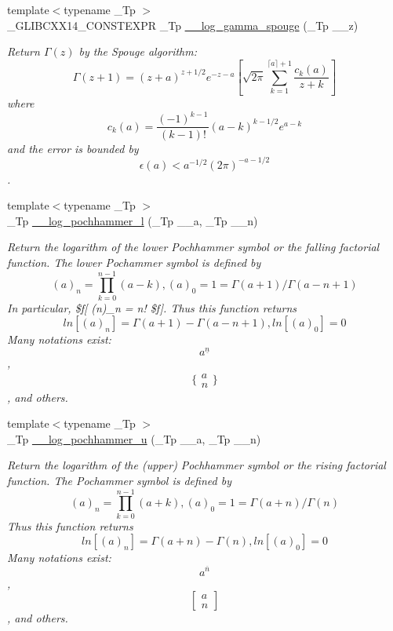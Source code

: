 \begin{DoxyCompactItemize}
{\footnotesize template$<$typename \+\_\+\+Tp $>$ }\\\+\_\+\+G\+L\+I\+B\+C\+X\+X14\+\_\+\+C\+O\+N\+S\+T\+E\+X\+P\+R \+\_\+\+Tp \hyperlink{namespacestd_1_1____detail_adf0ab4fe086fff067e7c9e11104562b1}{\+\_\+\+\_\+log\+\_\+gamma\+\_\+spouge} (\+\_\+\+Tp \+\_\+\+\_\+z)
\begin{DoxyCompactList}\small\item\em Return $\Gamma(z)$ by the Spouge algorithm\+: \[ \Gamma(z+1) = (z+a)^{z+1/2}e^{-z-a}\left[ \sqrt{2\pi} \sum_{k=1}^{\lceil a \rceil + 1}\frac{c_k(a)}{z+k}\right] \] where \[ c_k(a) = \frac{(-1)^{k-1}}{(k-1)!}(a-k)^{k-1/2}e^{a-k} \] and the error is bounded by \[ \epsilon(a) < a^{-1/2}(2\pi)^{-a-1/2} \]. \end{DoxyCompactList}\item 
{\footnotesize template$<$typename \+\_\+\+Tp $>$ }\\\+\_\+\+Tp \hyperlink{namespacestd_1_1____detail_a287ee67c3a3214ed32d161bede80fbf4}{\+\_\+\+\_\+log\+\_\+pochhammer\+\_\+l} (\+\_\+\+Tp \+\_\+\+\_\+a, \+\_\+\+Tp \+\_\+\+\_\+n)
\begin{DoxyCompactList}\small\item\em Return the logarithm of the lower Pochhammer symbol or the falling factorial function. The lower Pochammer symbol is defined by \[ (a)_n = \prod_{k=0}^{n-1} (a - k), (a)_0 = 1 = \Gamma(a + 1) / \Gamma(a - n + 1) \] In particular, \$f\mbox{[} (n)\+\_\+n = n! \$f\mbox{]}. Thus this function returns \[ ln[(a)_n] = \Gamma(a + 1) - \Gamma(a - n + 1), ln[(a)_0] = 0 \] Many notations exist\+: \[ a^{\underline{n}} \], \[ \{ \begin{array}{c} a \\ n \end{array} \} \], and others. \end{DoxyCompactList}\item 
{\footnotesize template$<$typename \+\_\+\+Tp $>$ }\\\+\_\+\+Tp \hyperlink{namespacestd_1_1____detail_a562403a92b80066d306b054eb319460b}{\+\_\+\+\_\+log\+\_\+pochhammer\+\_\+u} (\+\_\+\+Tp \+\_\+\+\_\+a, \+\_\+\+Tp \+\_\+\+\_\+n)
\begin{DoxyCompactList}\small\item\em Return the logarithm of the (upper) Pochhammer symbol or the rising factorial function. The Pochammer symbol is defined by \[ (a)_n = \prod_{k=0}^{n-1} (a + k), (a)_0 = 1 = \Gamma(a + n) / \Gamma(n) \] Thus this function returns \[ ln[(a)_n] = \Gamma(a + n) - \Gamma(n), ln[(a)_0] = 0 \] Many notations exist\+: \[ a^{\overline{n}} \], \[ \left[ \begin{array}{c} a \\ n \end{array} \right] \], and others. \end{DoxyCompactList}\item 

\end{DoxyCompactItemize}
